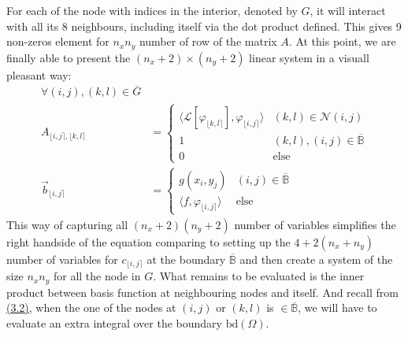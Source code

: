 \documentclass[]{article}
\begin{document}
    For each of the node with indices in the interior, denoted by $G$, it will interact with all its 8 neighbours, including itself via the dot product defined. This gives 9 non-zeros element for $n_xn_y$ number of row of the matrix $A$. At this point, we are finally able to present the $(n_x + 2)\times(n_y + 2)$ linear system in a visuall pleasant way: 
    \begin{align*}\tag{3.8}\label{eqn:3.8}
        \forall (i,j), (k, l) \in \overline{G}&
        \\
        A_{\lfloor i,j \rceil, \lfloor k, l \rceil}
        &= 
        \begin{cases}
            \langle \mathcal{L}[\varphi_{\lfloor k, l \rceil}], \varphi_{\lfloor i,j \rceil}\rangle & (k, l) \in \mathcal{N}(i, j)
            \\
            1 & (k, l), (i, j) \in \overline{\mathbb{B}}
            \\
            0 & \text{else}
        \end{cases}
        \\
        \vec{b}_{\lfloor i,j \rceil} &= 
        \begin{cases}
            g(x_i, y_j) & (i, j)\in \overline{\mathbb{B}}
            \\
            \langle f,\varphi_{\lfloor i,j \rceil} \rangle & \text{else}
        \end{cases}
    \end{align*}
    This way of capturing all $(n_x + 2)(n_y + 2)$ number of variables simplifies the right handside of the equation comparing to setting up the $4 + 2(n_x + n_y)$ number of variables for $c_{\lfloor i, j\rceil}$ at the boundary $\overline{\mathbb{B}}$ and then create a system of the size $n_xn_y$ for all the node in $G$. What remains to be evaluated is the inner product between basis function at neighbouring nodes and itself. And recall from \hyperref[eqn:3.2]{(3.2)}, when the one of the nodes at $(i,j)$ or $(k, l)$ is $\in \overline{\mathbb{B}}$, we will have to evaluate an extra integral over the boundary $\text{bd}(\Omega)$. 

        
\end{document}
